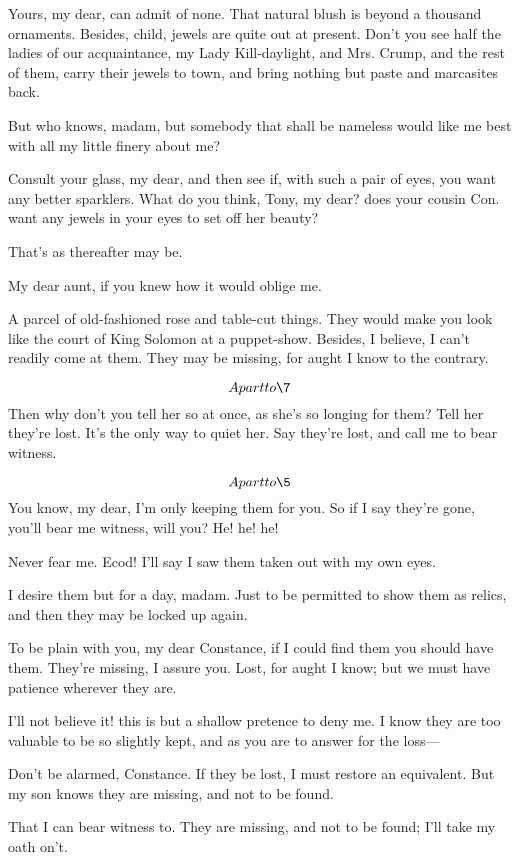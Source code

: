 \documentclass{book}
\begin{document}
\7  Yours, my dear, can admit of none.  That natural
blush is beyond a thousand ornaments.  Besides, child, jewels are quite
out at present.  Don't you see half the ladies of our acquaintance, my
Lady Kill-daylight, and Mrs. Crump, and the rest of them, carry their
jewels to town, and bring nothing but paste and marcasites back.

\9  But who knows, madam, but somebody that shall be
nameless would like me best with all my little finery about me?

\7  Consult your glass, my dear, and then see if, with
such a pair of eyes, you want any better sparklers.  What do you think,
Tony, my dear? does your cousin Con. want any jewels in your eyes to
set off her beauty?

\5  That's as thereafter may be.

\9  My dear aunt, if you knew how it would oblige me.

\7  A parcel of old-fashioned rose and table-cut things. 
They would make you look like the court of King Solomon at a
puppet-show.  Besides, I believe, I can't readily come at them.  They
may be missing, for aught I know to the contrary.

\5  \[Apart to \7\]  Then why don't you tell her so at
once, as she's so longing for them?  Tell her they're lost.  It's the
only way to quiet her.  Say they're lost, and call me to bear witness.

\7  \[Apart to \5\]  You know, my dear, I'm only
keeping them for you.  So if I say they're gone, you'll bear me
witness, will you?  He! he! he!

\5  Never fear me.  Ecod! I'll say I saw them taken out with my own
eyes.

\9  I desire them but for a day, madam.  Just to be
permitted to show them as relics, and then they may be locked up
again.

\7  To be plain with you, my dear Constance, if I could
find them you should have them.  They're missing, I assure you.  Lost,
for aught I know; but we must have patience wherever they are.

\9  I'll not believe it! this is but a shallow pretence to
deny me.  I know they are too valuable to be so slightly kept, and as
you are to answer for the loss---

\7  Don't be alarmed, Constance.  If they be lost, I must
restore an equivalent.  But my son knows they are missing, and not to
be found.

\5  That I can bear witness to.  They are missing, and not to be
found; I'll take my oath on't.
\end{document}
